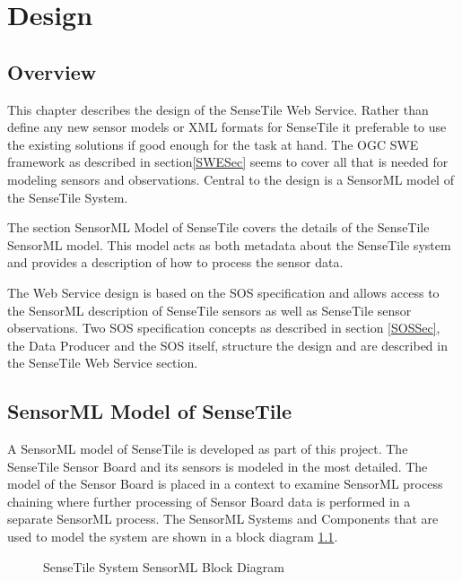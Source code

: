 \documentclass[]{final_report}
\begin{document}
\chapter{Design}
\section{Overview}
This chapter describes the design of the SenseTile Web Service. Rather than define any new sensor models or XML formats for SenseTile it preferable to use the existing solutions if good enough for the task at hand. The OGC SWE framework as described in section\ref{SWESec} seems to cover all that is needed for modeling sensors and observations. Central to the design is a SensorML model of the SenseTile System. 

The section SensorML Model of SenseTile covers the details of the SenseTile SensorML model. This model acts as both metadata about the SenseTile system and provides a description of how to process the sensor data.

The Web Service design is based on the SOS specification and allows access to the SensorML description of SenseTile sensors as well as SenseTile sensor observations. Two SOS specification concepts as described in section \ref{SOSSec}, the Data Producer and the SOS itself, structure the design and are described in the SenseTile Web Service section.

\section{SensorML Model of SenseTile}\label{SenseTileModelSec}

A SensorML model of SenseTile is developed as part of this project. The SenseTile Sensor Board and its sensors is modeled in the most detailed. The model of the Sensor Board is placed in a context to examine SensorML process chaining where further processing of Sensor Board data is performed in a separate SensorML process. The SensorML Systems and Components that are used to model the system are shown in a block diagram \ref{fig:SensorML_SenseTile_System_comp}.

\begin{figure}[h]
\centering
{}
\caption{SenseTile System SensorML Block Diagram}\label{fig:SensorML_SenseTile_System_comp}
\end{figure}
\end{document}
